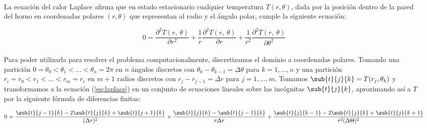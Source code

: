 \documentclass[12pt]{article}
\begin{document}
\paragraph{} La ecuación del calor Laplace afirma que en estado estacionario cualquier temperatura \(T(r, \theta)\), dada por la posición dentro de la pared del horno en coordenadas polares \((r, \theta)\) que representan al radio y el ángulo polar, cumple la siguiente ecuación: 

\begin{equation}
\label{eq:laplace}
  0 = \frac{\partial^2T(r,\ \theta)}{\partial r^2} + \frac{1}{r} \frac{\partial^2T(r,\ \theta)}{\partial r} + \frac{1}{r^2} \frac{\partial^2T(r,\ \theta)}{\partial\theta^2}
\end{equation}

\paragraph{} Para poder utilizarla para resolver el problema computacionalmente, discretizamos el dominio a coordenadas polares. Tomando una partición \(0 = \theta_0 < \theta_1 < ... < \theta_n = 2\pi\) en \(n\) ángulos discretos con \(\theta_k - \theta_{k-1} = \Delta\theta\) para \(k = 1, ..., n\) y una partición \(r_i = r_0 < r_1 < ... < r_m = r_e\) en \(m+1\) radios discretos con \(r_j - r_{j-1} = \Delta r\) para \(j = 1, ..., m\). Tomamos \(\sub{t}{j}{k} = T(r_j, \theta_k)\) y transformamos a la ecuación (\ref{eq:laplace}) en un conjunto de ecuaciones lineales sobre las incógnitas \(\sub{t}{j}{k}\), aproximando así a \(T\) por la siguiente fórmula de diferencias finitas: %

\begin{equation}
\label{eq:laplace.finita}
0 = \frac{\sub{t}{j-1}{k} - 2\sub{t}{j}{k} + \sub{t}{j+1}{k}}{(\Delta r)^2} + \frac{\sub{t}{j}{k} - \sub{t}{j-1}{k}}{r \Delta r} + \frac{\sub{t}{j}{k-1} - 2\sub{t}{j}{k} + \sub{t}{j}{k+1}}{r^2 (\Delta \Theta)^2}
\end{equation}
\end{document}

